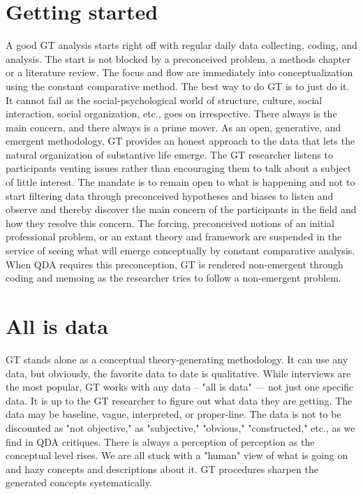 \section*{Getting started}

A good GT analysis starts right off with regular daily data collecting, coding, and analysis. 
The start is not blocked by a preconceived problem, a methods chapter
or a literature review. 
The focus and flow are immediately into conceptualization using the constant comparative method. 
The best way to do GT is to just do it. 
It cannot fail as the social-psychological world of structure, culture, social
interaction, social organization, etc., goes on irrespective. 
There always is the main concern, and there always is a prime mover. 
As an open, generative, and emergent methodology, 
GT provides an honest approach to the data that lets the natural organization of substantive life emerge. 
The GT researcher listens to participants venting issues rather than encouraging them to talk about a subject of little interest. 
The mandate is to remain open to what is happening and not to start filtering data through preconceived hypotheses and biases to listen and observe and thereby discover the main concern of the participants in the field and how they resolve this concern. 
The forcing, preconceived notions of an initial professional problem, 
or an extant theory and framework are suspended in the service of seeing what will emerge conceptually by constant comparative analysis. 
When QDA requires this preconception, GT is rendered non-emergent through coding and memoing as the researcher tries to follow a non-emergent problem.

\section*{All is data}

GT stands alone as a conceptual theory-generating methodology. 
It can use any data, but obviously, the favorite data to date is qualitative. 
While interviews are the most popular, 
GT works with any data -- "all is data" --- not just one specific data. 
It is up to the GT researcher to figure out what data they are getting. 
The data may be baseline, vague, interpreted, or proper-line. 
The data is not to be discounted as "not objective," 
as "subjective," "obvious," "constructed," etc., as we find in QDA critiques. 
There is always a perception of perception as the conceptual level rises.
We are all stuck with a "human" view of what is going on
and hazy concepts and descriptions about it. 
GT procedures sharpen the generated concepts systematically.

